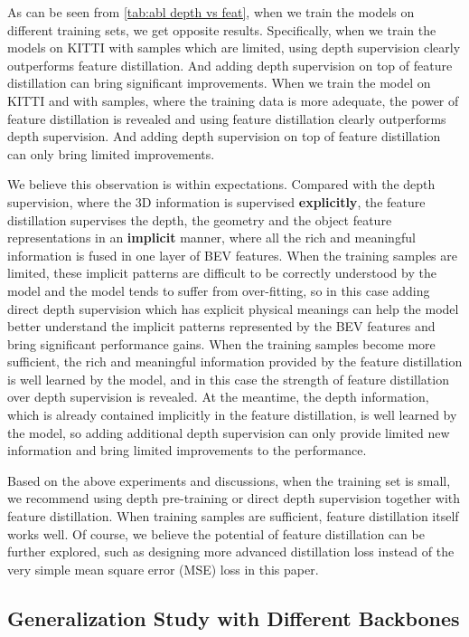 \documentclass[runningheads]{llncs}
\begin{document}
As can be seen from \cref{tab:abl depth vs feat}, when we train the models on different training sets, we get opposite results.
Specifically, when we train the models on KITTI  with  samples which are limited, using depth supervision clearly outperforms feature distillation. And adding depth supervision on top of feature distillation can bring significant improvements.
When we train the model on KITTI  and  with  samples, where the training data is more 
adequate, the power of feature distillation is revealed and using feature distillation clearly outperforms depth supervision.
And adding depth supervision on top of feature distillation can only bring limited improvements.

We believe this observation is within expectations.
Compared with the depth supervision, where the 3D information is supervised \textbf{explicitly}, the feature distillation supervises the depth, the geometry and the object feature representations in an \textbf{implicit} manner, where all the rich and meaningful information is fused in one layer of BEV features.
When the training samples are limited, these implicit patterns are difficult to be correctly understood by the model and the model tends to suffer from over-fitting, so in this case adding direct depth supervision which has explicit physical meanings can help the model better understand the implicit patterns represented by the BEV features and bring significant performance gains.
When the training samples become more sufficient, the rich and meaningful information provided by the feature distillation is well learned by the model, and in this case the strength of feature distillation over depth supervision is revealed.
At the meantime, the depth information, which is already contained implicitly in the feature distillation, is well learned by the model, so adding additional depth supervision can only provide limited new information and bring limited improvements to the performance.



Based on the above experiments and discussions, when the training set is small, we recommend using depth pre-training or direct depth supervision together with feature distillation.
When training samples are sufficient, feature distillation itself works well. 
Of course, we believe the potential of feature distillation can be further explored, such as designing more advanced distillation loss instead of the very simple mean square error (MSE) loss in this paper.

\subsection{Generalization Study with Different Backbones}
\end{document}
